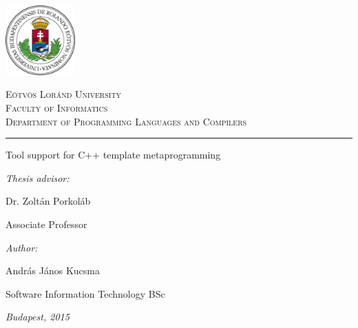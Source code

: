\begin{titlepage}

\noindent
\parbox[m]{0.2\textwidth}{
    \includegraphics[width=0.2\textwidth]{img/elte_logo_colored.eps}
}
\hfill
\parbox[m]{0.7\textwidth}{
    \begin{center}
    \begin{large}
    \textsc{
        Eötvös Loránd University\\
        \vspace{0.5pc}
        Faculty of Informatics\\
        \vspace{0.5pc}
        Department of Programming Languages and Compilers\\
    }
    \end{large}
    \end{center}
}

\vspace{1pc}
\hrule

\vfill

\begin{center}
    {\LARGE Tool support for C++ template metaprogramming}
\end{center}

\vfill

\noindent
\hspace*{0.05\textwidth}
\parbox{0.45\textwidth}{
    {\it Thesis advisor:}
    \bigskip

    {\Large Dr. Zoltán Porkoláb}
    \smallskip

    Associate Professor
}
\hfill
\parbox{0.45\textwidth}{
    {\it Author:}
    \bigskip

    {\Large András János Kucsma}
    \smallskip

    Software Information Technology BSc
}


\vfill

\begin{center}
    {\large {\it Budapest, 2015}}
\end{center}

\end{titlepage}
